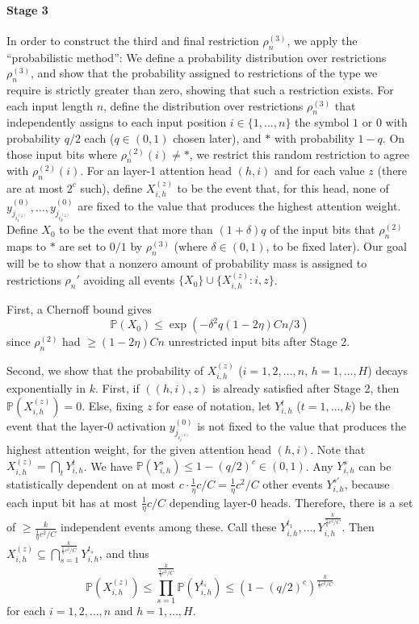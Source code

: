 \documentclass[11pt,a4paper]{article}
\newcommand{\Prob}{\mathbb{P}}%
\begin{document}
\paragraph{Stage 3}
In order to construct the third and final restriction $\rho^{(3)}_n$, we apply the ``probabilistic method'': We define a probability distribution over restrictions $\rho^{(3)}_n$, and show that the probability assigned to restrictions of the type we require is strictly greater than zero, showing that such a restriction exists.
For each input length $n$, define the distribution over restrictions $\rho_n^{(3)}$ that independently assigns to each input position $i \in \{1, \dots, n\}$ the symbol $1$ or $0$ with probability $q/2$ each ($q \in (0,1)$ chosen later), and $*$ with probability $1-q$.
On those input bits where $\rho_n^{(2)}(i) \neq *$, we restrict this random restriction to agree with $\rho_n^{(2)}(i)$.
For an layer-1 attention head $(h,i)$ and for each value $z$ (there are at most $2^c$ such), define $X_{i,h}^{(z)}$ to be the event that, for this head, none of $y_{j_{i_1^{(z)}}}^{(0)}, \dots, y_{j_{i_k^{(z)}}}^{(0)}$ are fixed to the value that produces the highest attention weight.
Define $X_0$ to be the event that more than $(1+\delta)q$ of the input bits that $\rho_n^{(2)}$ maps to $*$ are set to $0/1$ by $\rho_n^{(3)}$ (where $\delta \in (0,1)$, to be fixed later).
Our goal will be to show that a nonzero amount of probability mass is assigned to restrictions $\rho_n'$ avoiding all events $\{X_0\} \cup \{X_{i,h}^{(z)} : i, z\}$.

First, a Chernoff bound gives~\cite[Theorem 4.4]{mitzenmacherprobability}
\begin{equation}
\Prob(X_0) \leq    \exp\left(-\delta^2q(1-2\eta)Cn / 3\right)
\end{equation}
since $\rho_n^{(2)}$ had $\geq (1-2\eta)Cn$ unrestricted input bits after Stage 2.

Second, we show that the probability of $X_{i,h}^{(z)}$ ($i=1,2,\dots, n$, $h=1, \dots, H$) decays exponentially in $k$.
First, if $((h,i),z)$ is already satisfied after Stage 2, then $\Prob(X_{i,h}^{(z)}) = 0$.
Else, fixing $z$ for ease of notation, let $Y_{i,h}^t$ ($t=1,\dots,k$) be the event that the layer-0 activation $y_{j_{i_t^{(z)}}}^{(0)}$ is not fixed to the value that produces the highest attention weight, for the given attention head $(h,i)$.
Note that $X_{i,h}^{(z)} = \bigcap_t Y_{i,h}^t$.
We have $\Prob(Y_{i,h}^s) \leq 1-(q/2)^c \in (0,1)$. 
Any $Y_{i,h}^s$ can be statistically dependent on at most $c \cdot \frac{1}{\eta}c/C = \frac{1}{\eta}c^2/C$ other events $Y_{i,h}^{s'}$, because each input bit has at most $\frac{1}{\eta} c/C$ depending layer-0 heads.
Therefore, there is a set of $\geq \frac{k}{\frac{1}{\eta}c^2/C}$ independent events among these.
Call these $Y_{i,h}^{t_1}, \dots, Y_{i,h}^{\frac{k}{\frac{1}{\eta}c^2/C}}$.
Then $X_{i,h}^{(z)} \subseteq \bigcap_{s=1}^{\frac{k}{\frac{1}{\eta}c^2/C}} Y_{i,h}^{t_s}$, and thus
\begin{equation}
\Prob(X_{i,h}^{(z)}) \leq \prod_{s=1}^{\frac{k}{\frac{1}{\eta}c^2/C}} \Prob(Y_{i,h}^{t_s}) \leq \left(1-(q/2)^c\right)^{\frac{k}{\frac{1}{\eta}c^2/C}}
\end{equation}
for each $i=1,2,\dots, n$ and $h=1, \dots, H$.
\end{document}
